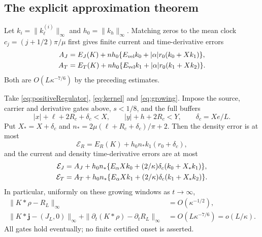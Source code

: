 \subsection{The explicit approximation theorem}
Let $k_i=\|k_\ell^{(i)}\|_\infty$ and $h_0=\|k_h\|_\infty$.
Matching zeros to the mean clock $c_j=(j+1/2)\pi/\mu$ first gives
finite current and time-derivative errors
\begin{align}
 A_J&=E_J(K)+nh_0\{E_{\rm vel}k_0+|\alpha|r_0(k_0+Xk_1)\},\notag\\
 A_T&=E_T(K)+nh_0\{E_{\rm vel}k_1+|\alpha|r_0(k_1+Xk_2)\}.
 \label{eq:meanclockcosts}
\end{align}
Both are $O(L\kappa^{-7/6})$ by the preceding estimates.

\begin{theorem}\label{thm:explicit}
Take \eqref{eq:positiveRegulator}, \eqref{eq:kernel} and
\eqref{eq:growing}. Impose the source, carrier and derivative gates
above, $s<1/8$, and the full buffers
\begin{equation}
 |x|+\ell+2R_c+\delta_c<X,\qquad |y|+h+2R_c<Y,\qquad
 \delta_c=Xe/L.
 \label{eq:explicitbuffer}
\end{equation}
Put $X_*=X+\delta_c$ and
$n_*=2\mu(\ell+R_c+\delta_c)/\pi+2$.
Then the density error is at most
\begin{equation}
 \mathcal E_R=E_R(K)+h_0n_*k_1(r_0+\delta_c),
 \label{eq:finalRerror}
\end{equation}
and the current and density time-derivative errors are at most
\begin{align}
 \mathcal E_J&=A_J+h_0n_*
       \{E_\alpha Xk_0+(2/\kappa)\delta_c(k_0+X_*k_1)\},\notag\\
 \mathcal E_T&=A_T+h_0n_*
       \{E_\alpha Xk_1+(2/\kappa)\delta_c(k_1+X_*k_2)\}.
 \label{eq:finalTransportError}
\end{align}
In particular, uniformly on these growing windows as $t\to\infty$,
\begin{align}
 \|K*\rho-R_L\|_\infty&=O(\kappa^{-1/2}),\label{eq:explicitDensityRate}\\
 \|K*\mathbf j-(J_L,0)\|_\infty+
 \|\partial_t(K*\rho)-\partial_tR_L\|_\infty
 &=O(L\kappa^{-7/6})=o(L/\kappa).
 \label{eq:explicitTransportRate}
\end{align}
All gates hold eventually; no finite certified onset is asserted.
\end{theorem}
